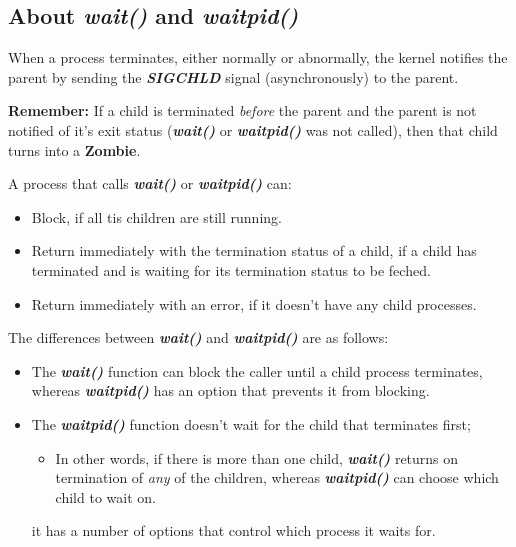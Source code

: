 \documentclass{article}
\newcommand\be[1]{\textbf{\emph{#1}}}
\begin{document}
\subsection{About \be{wait()} and \be{waitpid()}}
When a process terminates, either normally or abnormally, the kernel notifies
the parent by sending the \be{SIGCHLD} signal (asynchronously) to the parent.\newline

\textbf{Remember:} If a child is terminated \emph{before} the parent and the
parent is not notified of it's exit status (\be{wait()} or \be{waitpid()} was 
not called), then that child turns into a \textbf{Zombie}.\newline

A process that calls \be{wait()} or \be{waitpid()} can:
\begin{itemize}
    \item Block, if all tis children are still running.
    \item Return immediately with the termination status of a child, if a child has
        terminated and is waiting for its termination status to be feched.
    \item Return immediately with an error, if it doesn't have any child processes.
\end{itemize}

The differences between \be{wait()} and \be{waitpid()} are as follows:
\begin{itemize}
    \item The \be{wait()} function can block the caller until a child process 
        terminates, whereas \be{waitpid()} has an option that prevents it from 
        blocking.
    \item The \be{waitpid()} function doesn't wait for the child that terminates first; 
        \begin{itemize}
            \item In other words, if there is more than one child, \be{wait()} 
                returns on termination of \emph{any} of the children, whereas \be{waitpid()} can 
            choose which child to wait on.
        \end{itemize}
        it has a number of options that control which process it waits for.
\end{itemize}
\end{document}
